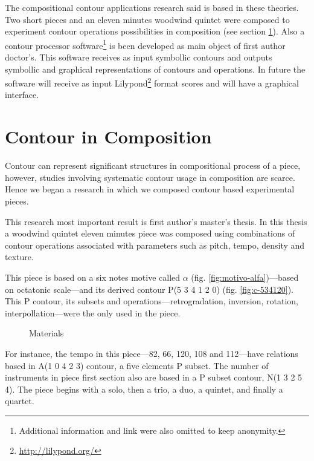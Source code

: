 The compositional contour applications research said is based in these
theories. Two short pieces and an eleven minutes woodwind quintet were
composed to experiment contour operations possibilities in composition
(see section \ref{sec:contour-composition}). Also a contour processor
software\footnote{Additional information and link were also omitted to
  keep anonymity.} is been developed as main object of first author
doctor's. This software receives as input symbollic contours and
outputs symbollic and graphical representations of contours and
operations. In future the software will receive as input
Lilypond\footnote{\url{http://lilypond.org/}} format scores and will
have a graphical interface.

\section{Contour in Composition}
\label{sec:contour-composition}

Contour can represent significant structures in compositional process
of a piece, however, studies involving systematic contour usage in
composition are scarce. Hence we began a research in which we composed
contour based experimental pieces.

This research most important result is first author's master's
thesis. In this thesis a woodwind quintet eleven minutes piece was
composed using combinations of contour operations associated with
parameters such as pitch, tempo, density and texture.

This piece is based on a six notes motive called $\alpha$
(fig. \ref{fig:motivo-alfa})---based on octatonic scale---and its
derived contour P(5 3 4 1 2 0) (fig. \ref{fig:c-534120}). This P
contour, its subsets and operations---retrogradation, inversion,
rotation, interpollation---were the only used in the piece.

\begin{figure}[!p]
  \centering
  \subfloat[P(5 3 4 1 2 0) contour]{
    \texttt{[image: c-534120]}
    \label{fig:c-534120}
  }
  \caption{Materials}
  \label{fig:materials}
\end{figure}

For instance, the tempo in this piece---82, 66, 120, 108 and
112---have relations based in A(1 0 4 2 3) contour, a five elements P
subset. The number of instruments in piece first section also are
based in a P subset contour, N(1 3 2 5 4). The piece begins with a
solo, then a trio, a duo, a quintet, and finally a quartet.

